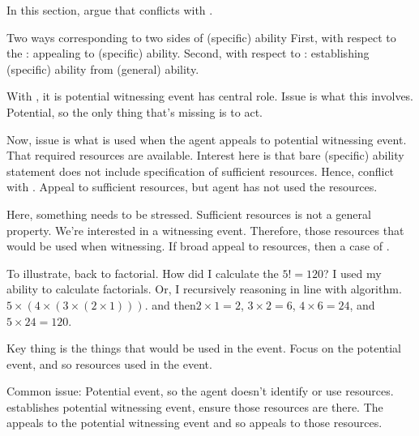 \begin{note}[Summary]
  In this section, argue that \ESU{} conflicts with \WR{}.

  Two ways corresponding to two sides of (specific) ability
  First, with respect to the \aben{}: appealing to (specific) ability.
  Second, with respect to \gsi{}: establishing (specific) ability from (general) ability.

  With \WR{}, it is potential witnessing event has central role.
  Issue is what this involves.
  Potential, so the only thing that's missing is to act.

  
  
  

  Now, issue is what is used when the agent appeals to potential witnessing event.
  That required resources are available.
  Interest here is that bare (specific) ability statement does not include specification of sufficient resources.
  Hence, conflict with \ESU{}.
  Appeal to sufficient resources, but agent has not used the resources.

  Here, something needs to be stressed.
  Sufficient resources is not a general property.
  We're interested in a witnessing event.
  Therefore, those resources that would be used when witnessing.
  If broad appeal to resources, then a case of \AR{}.

  To illustrate, back to factorial.
  How did I calculate the \(5! = 120\)?
  I used my ability to calculate factorials.
  Or, I recursively reasoning in line with algorithm.
  \(5 \times (4 \times (3 \times (2 \times 1)))\).
  and then\(2 \times 1 = 2\), \(3 \times 2 = 6\), \(4 \times 6 = 24\), and \(5 \times 24 = 120\).

  Key thing is the things that would be used in the event.
  Focus on the potential event, and so resources used in the event.

  Common issue: Potential event, so the agent doesn't identify or use resources.
  \gsi{} establishes potential witnessing event, ensure those resources are there.
  The \aben{} appeals to the potential witnessing event and so appeals to those resources.
\end{note}

